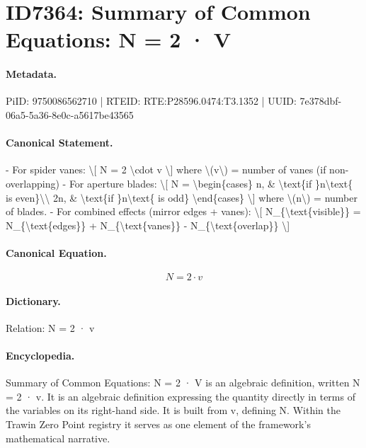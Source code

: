 \section*{ID7364: Summary of Common Equations: N = 2 · V}
\paragraph{Metadata.}
PiID: 9750086562710 | RTEID: RTE:P28596.0474:T3.1352 | UUID: 7e378dbf-06a5-5a36-8e0c-a5617be43565

\paragraph{Canonical Statement.}
- For spider vanes: \textbackslash{}[ N = 2 \textbackslash{}cdot v \textbackslash{}] where \textbackslash{}(v\textbackslash{}) = number of vanes (if non-overlapping) - For aperture blades: \textbackslash{}[ N = \textbackslash{}begin\{cases\} n, \& \textbackslash{}text\{if \}n\textbackslash{}text\{ is even\}\textbackslash{}\textbackslash{} 2n, \& \textbackslash{}text\{if \}n\textbackslash{}text\{ is odd\} \textbackslash{}end\{cases\} \textbackslash{}] where \textbackslash{}(n\textbackslash{}) = number of blades. - For combined effects (mirror edges + vanes): \textbackslash{}[ N\_\{\textbackslash{}text\{visible\}\} = N\_\{\textbackslash{}text\{edges\}\} + N\_\{\textbackslash{}text\{vanes\}\} - N\_\{\textbackslash{}text\{overlap\}\} \textbackslash{}]

\paragraph{Canonical Equation.}
\[
N = 2 \cdot v
\]

\paragraph{Dictionary.}
Relation: N = 2 · v

\paragraph{Encyclopedia.}
Summary of Common Equations: N = 2 · V is an algebraic definition, written N = 2 · v. It is an algebraic definition expressing the quantity directly in terms of the variables on its right-hand side. It is built from v, defining N. Within the Trawin Zero Point registry it serves as one element of the framework's mathematical narrative.
